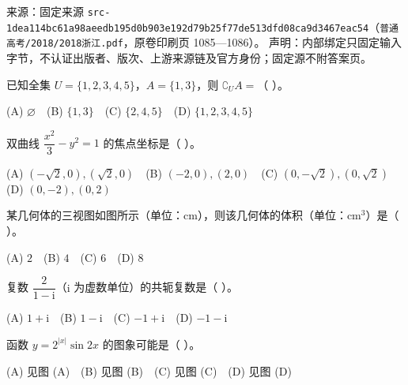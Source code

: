 
\begin{gktip}
来源：固定来源 \texttt{src-1dea114bc61a98aeedb195d0b903e192d79b25f77de513dfd08ca9d3467eac54}（\texttt{普通高考/2018/2018浙江.pdf}，原卷印刷页 1085—1086）。
声明：内部绑定只固定输入字节，不认证出版者、版次、上游来源链及官方身份；固定源不附答案页。
\end{gktip}

\par\medskip


\begin{question}
已知全集 $U = \{1, 2, 3, 4, 5\}$，$A = \{1, 3\}$，则 $\complement_U A =$（ ）。

(A) $\varnothing$　(B) $\{1, 3\}$　(C) $\{2, 4, 5\}$　(D) $\{1, 2, 3, 4, 5\}$

\end{question}
\begin{question}
双曲线 $\dfrac{x^2}{3} - y^2 = 1$ 的焦点坐标是（ ）。

(A) $(-\sqrt2, 0), (\sqrt2, 0)$　(B) $(-2, 0), (2, 0)$　(C) $(0, -\sqrt2), (0, \sqrt2)$　(D) $(0, -2), (0, 2)$

\Needspace{0.4\textheight}
\end{question}
\begin{question}
某几何体的三视图如图所示（单位：$\mathrm{cm}$），则该几何体的体积（单位：$\mathrm{cm}^3$）是（ ）。
\nopagebreak[4]
\begin{center}\end{center}
\nopagebreak[4]
(A) $2$　(B) $4$　(C) $6$　(D) $8$

\end{question}
\begin{question}
复数 $\dfrac{2}{1 - \mathrm i}$（$\mathrm i$ 为虚数单位）的共轭复数是（ ）。

(A) $1 + \mathrm i$　(B) $1 - \mathrm i$　(C) $-1 + \mathrm i$　(D) $-1 - \mathrm i$

\Needspace{0.4\textheight}
\end{question}
\begin{question}
函数 $y = 2^{|x|}\sin 2x$ 的图象可能是（ ）。
\nopagebreak[4]
\begin{center}\end{center}
\nopagebreak[4]
(A) 见图 (A)　(B) 见图 (B)　(C) 见图 (C)　(D) 见图 (D)

\end{question}
